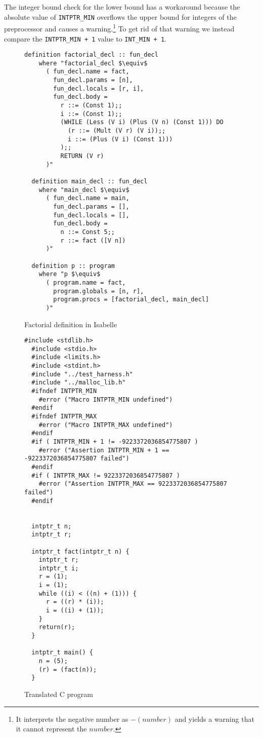 The integer bound check for the lower bound has a workaround because the absolute value of \verb|INTPTR_MIN| overflows the upper bound for integers of the preprocessor and causes a warning.\footnote{It interprets the negative number as $-(number)$ and yields a warning that it cannot represent the $number$.}
To get rid of that warning we instead compare the \verb|INTPTR_MIN + 1| value to \verb|INT_MIN + 1|.


\begin{figure}
\begin{lstlisting}[mathescape=true]
  definition factorial_decl :: fun_decl
    where "factorial_decl $\equiv$
      ( fun_decl.name = fact,
        fun_decl.params = [n],
        fun_decl.locals = [r, i],
        fun_decl.body =
          r ::= (Const 1);;
          i ::= (Const 1);;
          (WHILE (Less (V i) (Plus (V n) (Const 1))) DO
            (r ::= (Mult (V r) (V i));;
            i ::= (Plus (V i) (Const 1)))
          );;
          RETURN (V r)
      )"

  definition main_decl :: fun_decl
    where "main_decl $\equiv$
      ( fun_decl.name = main,
        fun_decl.params = [],
        fun_decl.locals = [],
        fun_decl.body =
          n ::= Const 5;;
          r ::= fact ([V n])
      )"

  definition p :: program
    where "p $\equiv$
      ( program.name = fact,
        program.globals = [n, r],
        program.procs = [factorial_decl, main_decl]
      )"
\end{lstlisting}
\caption{Factorial definition in Isabelle}
\label{fig:factorial_isabelle}
\end{figure}


\begin{figure}
\begin{lstlisting}[mathescape=true]
  #include <stdlib.h>
  #include <stdio.h>
  #include <limits.h>
  #include <stdint.h>
  #include "../test_harness.h"
  #include "../malloc_lib.h"
  #ifndef INTPTR_MIN
    #error ("Macro INTPTR_MIN undefined")
  #endif
  #ifndef INTPTR_MAX
    #error ("Macro INTPTR_MAX undefined")
  #endif
  #if ( INTPTR_MIN + 1 != -9223372036854775807 )
    #error ("Assertion INTPTR_MIN + 1 == -9223372036854775807 failed")
  #endif
  #if ( INTPTR_MAX != 9223372036854775807 )
    #error ("Assertion INTPTR_MAX == 9223372036854775807 failed")
  #endif


  intptr_t n;
  intptr_t r;

  intptr_t fact(intptr_t n) {
    intptr_t r;
    intptr_t i;
    r = (1);
    i = (1);
    while ((i) < ((n) + (1))) {
      r = ((r) * (i));
      i = ((i) + (1));
    }
    return(r);
  }

  intptr_t main() {
    n = (5);
    (r) = (fact(n));
  }
\end{lstlisting}
\caption{Translated C program}
\label{fig:factorial_c}
\end{figure}

